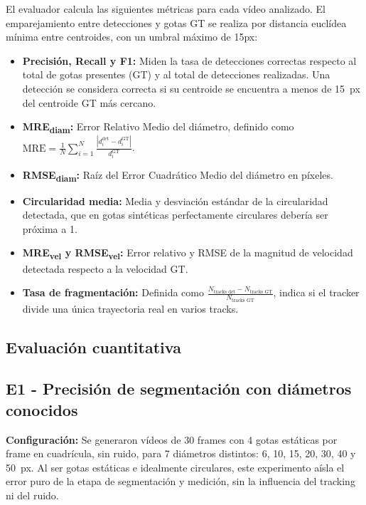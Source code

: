 El evaluador calcula las siguientes métricas \cite{powers2011evaluation}\cite{everingham2010pascal} para cada vídeo analizado. El emparejamiento entre detecciones y gotas GT se realiza por distancia euclídea mínima entre centroides, con un umbral máximo de 15px:

\begin{itemize}
    \item \textbf{Precisión, Recall y F1:} Miden la tasa de detecciones correctas respecto al total de gotas presentes (GT) y al total de detecciones realizadas. Una detección se considera correcta si su centroide se encuentra a menos de 15~px del centroide GT más cercano.
    \item \textbf{MRE\textsubscript{diam}:} Error Relativo Medio del diámetro, definido como $\text{MRE} = \frac{1}{N}\sum_{i=1}^{N}\frac{|d_i^{\text{det}} - d_i^{\text{GT}}|}{d_i^{\text{GT}}}$.
    \item \textbf{RMSE\textsubscript{diam}:} Raíz del Error Cuadrático Medio del diámetro en píxeles.
    \item \textbf{Circularidad media:} Media y desviación estándar de la circularidad detectada, que en gotas sintéticas perfectamente circulares debería ser próxima a 1.
    \item \textbf{MRE\textsubscript{vel} y RMSE\textsubscript{vel}:} Error relativo y RMSE de la magnitud de velocidad detectada respecto a la velocidad GT.
    \item \textbf{Tasa de fragmentación:} Definida como $\frac{N_{\text{tracks det}} - N_{\text{tracks GT}}}{N_{\text{tracks GT}}}$, indica si el tracker divide una única trayectoria real en varios tracks.
\end{itemize}

\subsection{Evaluación cuantitativa}

\subsection{E1 - Precisión de segmentación con diámetros conocidos}
 
\textbf{Configuración:} Se generaron vídeos de 30 frames con 4 gotas estáticas por frame en cuadrícula, sin ruido, para 7 diámetros distintos: 6, 10, 15, 20, 30, 40 y 50~px. Al ser gotas estáticas e idealmente circulares, este experimento aísla el error puro de la etapa de segmentación y medición, sin la influencia del tracking ni del ruido.

